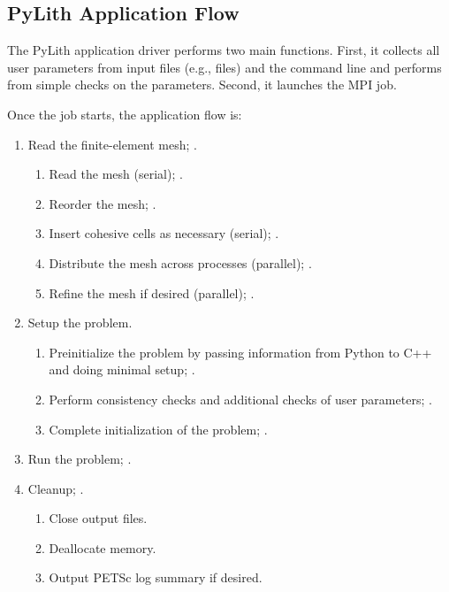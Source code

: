 
\subsection{PyLith Application Flow}

The PyLith application driver performs two main functions. First, it
collects all user parameters from input files (e.g., 
files) and the command line and performs from simple checks on the
parameters. Second, it launches the MPI job.

Once the job starts, the application flow is:
\begin{enumerate}
\item Read the finite-element mesh; .
  \begin{enumerate}
  \item Read the mesh (serial); .
  \item Reorder the mesh; .
  \item Insert cohesive cells as necessary (serial); .
  \item Distribute the mesh across processes (parallel); .
  \item Refine the mesh if desired (parallel); .
  \end{enumerate}
\item Setup the problem.
  \begin{enumerate}
  \item Preinitialize the problem by passing information from Python
    to C++ and doing minimal setup; .
  \item Perform consistency checks and additional checks of user
    parameters; .
  \item Complete initialization of the problem;
    .
  \end{enumerate}
\item Run the problem; .
\item Cleanup; .
  \begin{enumerate}
  \item Close output files.
  \item Deallocate memory.
  \item Output PETSc log summary if desired.
  \end{enumerate}
\end{enumerate}

